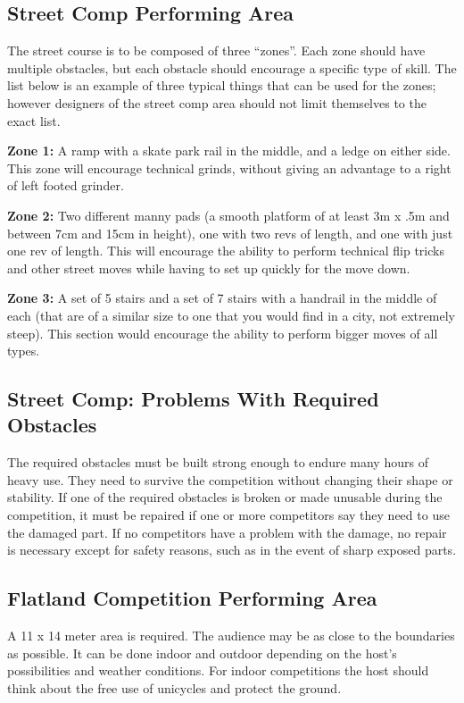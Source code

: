 \subsection{Street Comp Performing Area \label{subsec:flat-street_size-of-performing-area_street-comp}}
The street course is to be composed of three ``zones''.
Each zone should have multiple obstacles, but each obstacle should encourage a specific type of skill.
The list below is an example of three typical things that can be used for the zones; however designers of the street comp area should not limit themselves to the exact list.

\textbf{Zone 1:}
A ramp with a skate park rail in the middle, and a ledge on either side.
This zone will encourage technical grinds, without giving an advantage to a right of left footed grinder.

\textbf{Zone 2:}
Two different manny pads (a smooth platform of at least 3m x .5m and between 7cm and 15cm in height), one with two revs of length, and one with just one rev of length.
This will encourage the ability to perform technical flip tricks and other street moves while having to set up quickly for the move down.

\textbf{Zone 3:}
A set of 5 stairs and a set of 7 stairs with a handrail in the middle of each (that are of a similar size to one that you would find in a city, not extremely steep).
This section would encourage the ability to perform bigger moves of all types.

\subsection{Street Comp: Problems With Required Obstacles}
The required obstacles must be built strong enough to endure many hours of heavy use.
They need to survive the competition without changing their shape or stability.
If one of the required obstacles is broken or made unusable during the competition, it must be repaired if one or more competitors say they need to use the damaged part.
If no competitors have a problem with the damage, no repair is necessary except for safety reasons, such as in the event of sharp exposed parts. 

\subsection{Flatland Competition Performing Area}
A 11 x 14 meter area is required.
The audience may be as close to the boundaries as possible.
It can be done indoor and outdoor depending on the host's possibilities and weather conditions.
For indoor competitions the host should think about the free use of unicycles and protect the ground. 

